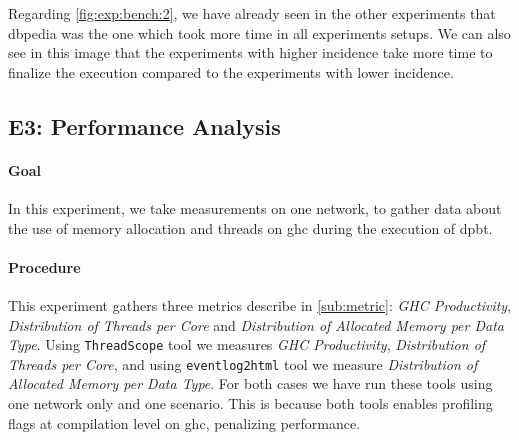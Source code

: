 Regarding \autoref{fig:exp:bench:2}, we have already seen in the other experiments that \acrshort{dbpedia} was the one which took more time in all experiments setups.
We can also see in this image that the experiments with higher incidence take more time to finalize the execution compared to the experiments with lower incidence. 

\subsection{E3: Performance Analysis}\label{sub:sec:exp-3} 
\paragraph{Goal} In this experiment, we take measurements on one network, to gather data about the use of memory allocation and threads on \acrshort{ghc} during the execution of \acrshort{dpbt}.

\paragraph{Procedure} This experiment gathers three metrics describe in \autoref{sub:metric}: \emph{GHC Productivity}, \emph{Distribution of Threads per Core} and \emph{Distribution of Allocated Memory per Data Type}.
Using \texttt{ThreadScope} \cite{threadscope} tool we measures \emph{GHC Productivity}, \emph{Distribution of Threads per Core}, and using \texttt{eventlog2html} \cite{eventlog2html} tool we measure \emph{Distribution of Allocated Memory per Data Type}.
For both cases we have run these tools using one network only and one scenario. This is because both tools enables profiling flags at compilation level on \acrshort{ghc}, penalizing performance.

\begin{table}[H]
\centering
{}
\caption[{[EE] E3 Procedure}]{This tables shows the experiments scenario run for each of the tools. Notice the increase of \texttt{-A} and \texttt{-H} to support more memory allocation due to the profiling analysis}
\label{table:e3:def}
\end{table}

